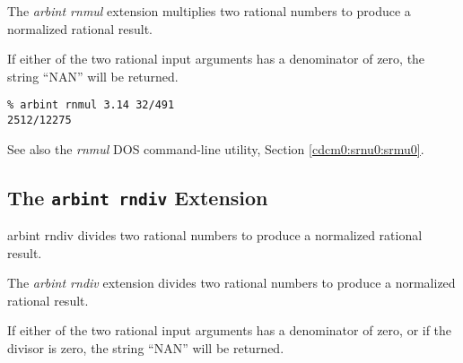 \begin{tclcommandsynopsis}
\end{tclcommandsynopsis}

\begin{tclcommanddescription}
The \emph{arbint rnmul} extension multiplies two rational numbers to produce a 
normalized rational result.

If either of the two rational input arguments has a denominator of zero,
the string ``NAN'' will be returned.
\end{tclcommanddescription}

\begin{tclcommandsampleinvocations}
\begin{scriptsize}
\begin{verbatim}
% arbint rnmul 3.14 32/491
2512/12275
\end{verbatim}
\end{scriptsize}
\end{tclcommandsampleinvocations}

\begin{tclcommandseealso}
See also the \emph{rnmul} DOS command-line utility, 
Section \cdcmzeroxrefhyphen{}\ref{cdcm0:srnu0:srmu0}.
\end{tclcommandseealso}


\subsection{The \texttt{arbint rndiv} Extension}
\label{cxtn0:srne0:srdv0}

\begin{tclcommandname}{arbint rndiv}%
divides two rational numbers to produce a normalized rational result.
\end{tclcommandname}

\begin{tclcommandsynopsis}
\end{tclcommandsynopsis}

\begin{tclcommanddescription}
The \emph{arbint rndiv} extension divides two rational numbers to produce a 
normalized rational result.

If either of the two rational input arguments has a denominator of zero, or
if the divisor is zero,
the string ``NAN'' will be returned.
\end{tclcommanddescription}

